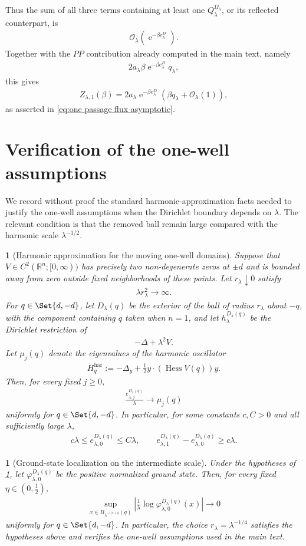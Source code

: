 \documentclass[a4paper,10pt]{article}
\numberwithin{equation}{section}
\theoremstyle{plain}
\theoremstyle{plain}
\theoremstyle{plain}
\theoremstyle{plain}
\newtheorem{prop}[thm]{\protect\propositionname}
\theoremstyle{plain}
\theoremstyle{remark}
\theoremstyle{definition}
\providecommand{\propositionname}{Proposition}
\newcommand{\ee}{\operatorname{e}}
\newcommand{\RR}{\mathbb{R}}
\newcommand{\calO}{\mathcal{O}}
\newcommand{\vf}{\varphi}
\newcommand{\eq}[1]{\begin{align*}#1\end{align*}}
\newcommand{\br}[1]{\left(#1\right)}
\begin{document}
Thus the sum of all three terms containing at least one
$Q_\lambda^{\Omega_\lambda}$, or its reflected counterpart, is
\eq{
\calO_\lambda\br{
\ee^{-\beta e_\lambda^D}
}.
}
Together with the $PP$ contribution already computed in the main text,
namely
\eq{
2a_\lambda\beta
\ee^{-\beta e_\lambda^D}
q_\lambda,
}
this gives
\eq{
Z_{\lambda,1}(\beta)
=
2a_\lambda
\ee^{-\beta e_\lambda^D}
\br{
\beta q_\lambda
+
\calO_\lambda(1)
},
}
as asserted in \cref{eq:one passage flux asymptotic}.

\section{Verification of the one-well assumptions}
\label{sec:verification-one-well-assumptions}

We record without proof the standard harmonic-approximation facts needed
to justify the one-well assumptions when the Dirichlet boundary depends
on $\lambda$. The relevant condition is that the removed ball remain
large compared with the harmonic scale $\lambda^{-1/2}$.

\begin{prop}[Harmonic approximation for the moving one-well domains]
\label{prop:moving-domain-harmonic-approximation}
Suppose that $V\in C^2(\RR^n;[0,\infty))$ has precisely two
non-degenerate zeros at $\pm d$ and is bounded away from zero outside
fixed neighborhoods of these points. Let $r_\lambda\downarrow0$ satisfy
\eq{
\lambda r_\lambda^2\longrightarrow\infty.
}
For $q\in\Set{d,-d}$, let $D_\lambda(q)$ be the exterior of the ball of
radius $r_\lambda$ about $-q$, with the component containing $q$ taken
when $n=1$, and let $h_\lambda^{D_\lambda(q)}$ be the Dirichlet
restriction of
\eq{
-\Delta+\lambda^2V.
}
Let $\mu_j(q)$ denote the eigenvalues of the harmonic oscillator
\eq{
H_q^{\mathrm{har}}
:=
-\Delta_y
+
\frac12
y\cdot\br{\operatorname{Hess}V(q)}y.
}
Then, for every fixed $j\geq0$,
\eq{
\frac{e_{\lambda,j}^{D_\lambda(q)}}{\lambda}
\longrightarrow
\mu_j(q)
}
uniformly for $q\in\Set{d,-d}$. In particular, for some constants
$c,C>0$ and all sufficiently large $\lambda$,
\eq{
c\lambda
\leq
e_{\lambda,0}^{D_\lambda(q)}
\leq
C\lambda,
\qquad
e_{\lambda,1}^{D_\lambda(q)}
-
e_{\lambda,0}^{D_\lambda(q)}
\geq
c\lambda.
}
\end{prop}

\begin{prop}[Ground-state localization on the intermediate scale]
\label{prop:moving-domain-ground-state-localization}
Under the hypotheses of
\cref{prop:moving-domain-harmonic-approximation}, let
$\vf_{\lambda,0}^{D_\lambda(q)}$ be the positive normalized ground
state. Then, for every fixed $\eta\in(0,\frac12)$,
\eq{
\sup_{x\in B_{\lambda^{-1/2+\eta}}(q)}
\left|
\frac1\lambda
\log
\vf_{\lambda,0}^{D_\lambda(q)}(x)
\right|
\longrightarrow0
}
uniformly for $q\in\Set{d,-d}$. In particular, the choice
$r_\lambda=\lambda^{-1/4}$ satisfies the hypotheses above and verifies
the one-well assumptions used in the main text.
\end{prop}


\newpage
\begingroup
\let\itshape\upshape
\printbibliography
\endgroup
\end{document}
